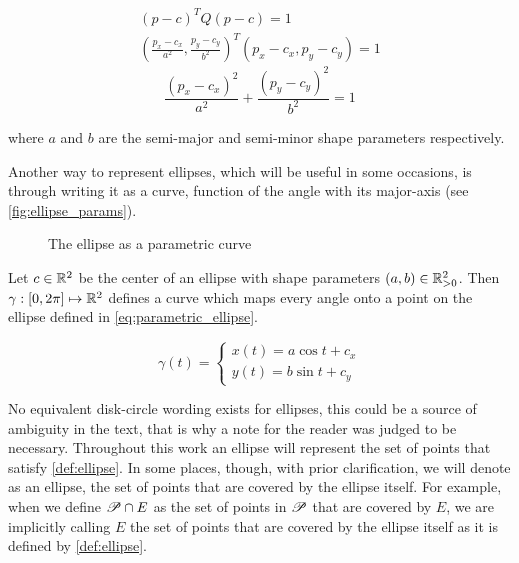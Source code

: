 \begin{align*}
        (p-c)^{T}Q(p-c) = 1\\
    (\frac{p_x-c_x}{a^2}, \frac{p_y-c_y}{b^2})^{T}(p_x-c_x, p_y-c_y) = 1
 \end{align*}
 \begin{equation}
  \frac{(p_x-c_x)^2}{a^2} + \frac{(p_y-c_y)^2}{b^2} = 1
 \end{equation}

where $a$ and $b$ are the semi-major and semi-minor shape parameters respectively.

Another way to represent ellipses, which will be useful in some occasions, is through writing it as a curve, function of the angle with its major-axis (see \autoref{fig:ellipse_params}).

\begin{figure}[H]
    \centering
    
    \caption{The ellipse as a parametric curve}
    
    \fautor
    \label{fig:ellipse_params}
\end{figure}

Let $c \in \mathbb{R}^2$ be the center of an ellipse with shape parameters $(a,b) \in \mathbb{R}^2_{>0}$. Then $\gamma : [0, 2\pi] \mapsto \mathbb{R}^2$ defines a curve which maps every angle onto a point on the ellipse defined in \autoref{eq:parametric_ellipse}.

    \begin{equation}\label{eq:parametric_ellipse}
    \gamma(t) = \left\{
    \begin{array}{l}
    x(t)= a\cos{t} + c_x\\
    y(t)=b\sin{t} + c_y
    \end{array}
    \right.
    \end{equation}

No equivalent disk-circle wording exists for ellipses, this could be a source of ambiguity in the text, that is why a note for the reader was judged to be necessary. Throughout this work an ellipse will represent the set of points that satisfy \autoref{def:ellipse}. In some places, though, with prior clarification, we will denote as an ellipse, the set of points that are covered by the ellipse itself. For example, when we define $\mathscr{P} \cap E$ as the set of points in $\mathscr{P}$ that are covered by $E$, we are implicitly calling $E$ the set of points that are covered by the ellipse itself as it is defined by \autoref{def:ellipse}.